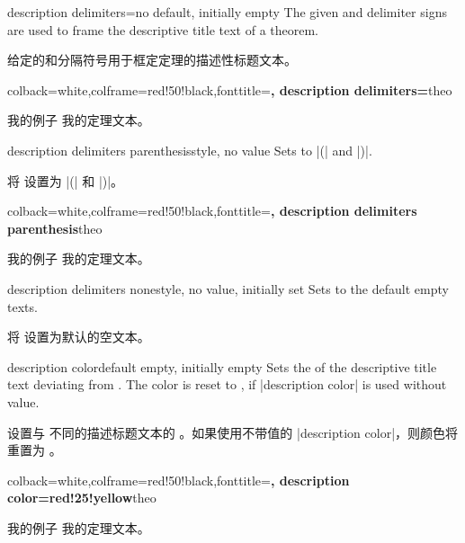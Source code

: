 \begin{docTcbKey}{description delimiters}{=}{no default, initially empty}
The given  and  delimiter signs are used to frame
the descriptive title text of a theorem.

给定的和分隔符号用于框定定理的描述性标题文本。
\begin{dispExample}
%
  {colback=white,colframe=red!50!black,fonttitle=\bfseries,
   description delimiters={\flqq}{\frqq}}{theo}
\begin{sometheorem}{我的例子}{}
我的定理文本。
\end{sometheorem}
\end{dispExample}
\end{docTcbKey}


\begin{docTcbKey}{description delimiters parenthesis}{}{style, no value}
Sets  to |(| and |)|.

将  设置为 |(| 和 |)|。
\begin{dispExample}
%
  {colback=white,colframe=red!50!black,fonttitle=\bfseries,
   description delimiters parenthesis}{theo}
\begin{sometheorem}{我的例子}{}
我的定理文本。
\end{sometheorem}
\end{dispExample}
\end{docTcbKey}


\begin{docTcbKey}{description delimiters none}{}{style, no value, initially set}
Sets  to the default empty texts.

将  设置为默认的空文本。
\end{docTcbKey}


\begin{docTcbKey}{description color}{}{default empty, initially empty}
Sets the  of the descriptive title text deviating from .
The color is reset to , if |description color| is used without value.

设置与  不同的描述标题文本的 。如果使用不带值的 |description color|，则颜色将重置为 。
\begin{dispExample}
%
  {colback=white,colframe=red!50!black,fonttitle=\bfseries,
   description color=red!25!yellow}{theo}
\begin{sometheorem}{我的例子}{}
我的定理文本。
\end{sometheorem}
\end{dispExample}
\end{docTcbKey}

